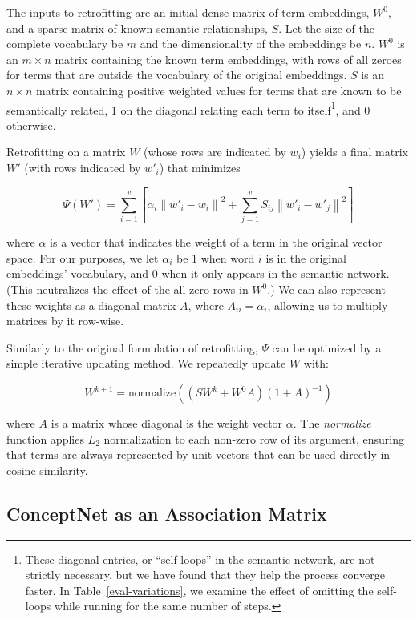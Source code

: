 \documentclass[11pt,letterpaper]{article}
\begin{document}
The inputs to retrofitting are an initial dense matrix of term embeddings,
$W^0$, and a sparse matrix of known semantic relationships, $S$. Let the size
of the complete vocabulary be $m$ and the dimensionality of the embeddings be $n$.
$W^0$ is an $m \times n$ matrix containing the known term embeddings, with
rows of all zeroes for terms that are outside the vocabulary of the original embeddings.
$S$ is an $n \times n$ matrix containing positive weighted values for terms that
are known to be semantically related, 1 on the diagonal relating each term to
itself\footnote{
    These diagonal entries, or ``self-loops'' in the semantic network, are not strictly
    necessary, but we have found that they help the process converge faster.
    In Table~\ref{eval-variations}, we examine the effect of omitting the self-loops
    while running for the same number of steps.
}, and 0 otherwise.

Retrofitting on a matrix $W$ (whose rows are indicated by $w_i$) yields a final
matrix $W'$ (with rows indicated by $w'_i$) that minimizes

\begin{small}
$$
\Psi \left( W' \right) = \sum_{i=1}^v \left[
  \alpha_i \left\|  w'_i - w_i \right\| ^ 2
  + \sum_{j=1}^v S_{ij} \left\| w'_i - w'_j \right\| ^ 2
\right]
$$
\end{small}

where $\alpha$ is a vector that indicates the weight of a term in the original
vector space. For our purposes, we let $\alpha_i$ be 1 when word $i$ is in the
original embeddings' vocabulary, and 0 when it only appears in the semantic
network. (This neutralizes the effect of the all-zero rows in $W^0$.) We can
also represent these weights as a diagonal matrix $A$, where $A_{ii} =
\alpha_i$, allowing us to multiply matrices by it row-wise.

Similarly to the original formulation of retrofitting, $\Psi$ can be optimized
by a simple iterative updating method. We repeatedly update $W$ with:

$$
W^{k+1} = \mathrm{normalize}\left( \left( S W^k + W^0 A \right)\left( 1 + A \right)^{-1} \right)
$$

where $A$ is a matrix whose diagonal is the weight vector $\alpha$. The {\em normalize}
function applies $L_2$ normalization to each non-zero row of its argument, ensuring
that terms are always represented by unit vectors that can be used directly in
cosine similarity.

\subsection{ConceptNet as an Association Matrix}
\end{document}
